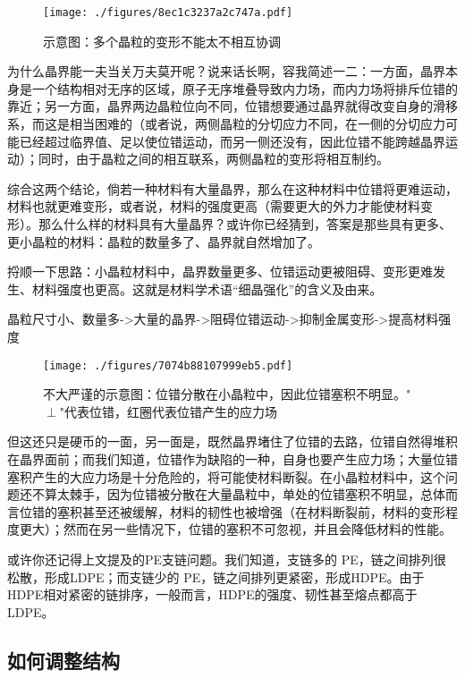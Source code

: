 \begin{figure}[ht]
\centering
\texttt{[image: ./figures/8ec1c3237a2c747a.pdf]}
\caption{示意图：多个晶粒的变形不能太不相互协调} \label{fig_MSEINT_7}
\end{figure}

为什么晶界能一夫当关万夫莫开呢？说来话长啊，容我简述一二：一方面，晶界本身是一个结构相对无序的区域，原子无序堆叠导致内力场，而内力场将排斥位错的靠近；另一方面，晶界两边晶粒位向不同，位错想要通过晶界就得改变自身的滑移系，而这是相当困难的（或者说，两侧晶粒的分切应力不同，在一侧的分切应力可能已经超过临界值、足以使位错运动，而另一侧还没有，因此位错不能跨越晶界运动）；同时，由于晶粒之间的相互联系，两侧晶粒的变形将相互制约。

综合这两个结论，倘若一种材料有大量晶界，那么在这种材料中位错将更难运动，材料也就更难变形，或者说，材料的强度更高（需要更大的外力才能使材料变形）。那么什么样的材料具有大量晶界？或许你已经猜到，答案是那些具有更多、更小晶粒的材料：晶粒的数量多了、晶界就自然增加了。

捋顺一下思路：小晶粒材料中，晶界数量更多、位错运动更被阻碍、变形更难发生、材料强度也更高。这就是材料学术语“细晶强化”的含义及由来。

晶粒尺寸小、数量多->大量的晶界->阻碍位错运动->抑制金属变形->提高材料强度

\begin{figure}[ht]
\centering
\texttt{[image: ./figures/7074b88107999eb5.pdf]}
\caption{不大严谨的示意图：位错分散在小晶粒中，因此位错塞积不明显。"$\perp$"代表位错，红圈代表位错产生的应力场} \label{fig_MSEINT_5}
\end{figure}

但这还只是硬币的一面，另一面是，既然晶界堵住了位错的去路，位错自然得堆积在晶界面前；而我们知道，位错作为缺陷的一种，自身也要产生应力场；大量位错塞积产生的大应力场是十分危险的，将可能使材料断裂。在小晶粒材料中，这个问题还不算太棘手，因为位错被分散在大量晶粒中，单处的位错塞积不明显，总体而言位错的塞积甚至还被缓解，材料的韧性也被增强（在材料断裂前，材料的变形程度更大）；然而在另一些情况下，位错的塞积不可忽视，并且会降低材料的性能。


或许你还记得上文提及的PE支链问题。我们知道，支链多的 PE，链之间排列很松散，形成LDPE；而支链少的 PE，链之间排列更紧密，形成HDPE。由于HDPE相对紧密的链排序，一般而言，HDPE的强度、韧性甚至熔点都高于LDPE。

\subsection{如何调整结构}

